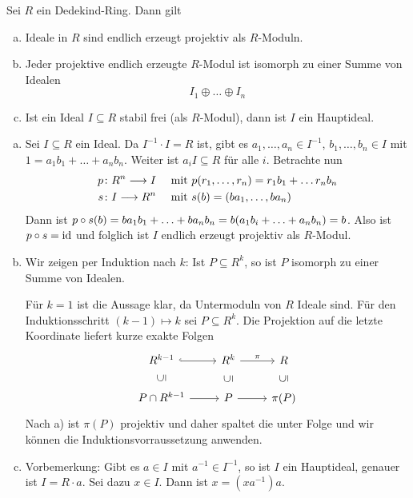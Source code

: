 \begin{lemma}[label=lem:ideale_dedekind]
	Sei $R$ ein Dedekind-Ring.
	Dann gilt
	\begin{enumerate}[a)]
		\item Ideale in $R$ sind endlich erzeugt projektiv als $R$-Moduln.
		\item Jeder projektive endlich erzeugte $R$-Modul ist isomorph zu einer Summe von Idealen 
		\[
			I_1 \oplus \ldots \oplus I_n
		\]
		\item Ist ein Ideal $I \subseteq R$ stabil frei (als $R$-Modul), dann ist $I$ ein Hauptideal.
	\end{enumerate}
\end{lemma}
\begin{beweis}
	\begin{enumerate}[a)]
		\item Sei $I \subseteq R$ ein Ideal. 
		Da $I^{-1} \cdot I=R$ ist, gibt es $a_1, \ldots, a_n \in I^{-1}$, $b_1, \ldots ,b_n \in I$ mit $1= a_1 b_1 + \ldots + a_n b_n$.
		Weiter ist $a_i I \subseteq R$ für alle $i$.
		Betrachte nun 
		\begin{align}
			p \colon R^n \longrightarrow I &\quad \text{ mit } p(r_1,\ldots ,r_n) =r_1 b_1+ \ldots r_n b_n \\
			s \colon I \longrightarrow R^n &\quad \text{ mit } s(b) = \enbrace*{b a_1, \ldots , b a_n}  
		\end{align}
		Dann ist $p \circ s(b) = b a_1 b_1 + \ldots + b a_n b_n = b \enbrace*{a_1 b_i + \ldots + a_n b_n}= b$.
		Also ist $p \circ s =\id$ und folglich ist $I$ endlich erzeugt projektiv als $R$-Modul.
		\item Wir zeigen per Induktion nach $k$: Ist $P \subseteq R^k$, so ist $P$ isomorph zu einer Summe von Idealen.
		
		Für $k=1$ ist die Aussage klar, da Untermoduln von $R$ Ideale sind. Für den Induktionsschritt $(k-1) \mapsto k$ sei $P \subseteq R^k$.
		Die Projektion auf die letzte Koordinate liefert kurze exakte Folgen 
		\[
			\begin{tikzcd}
				R^{k-1} \rar[hook] & R^k \rar["\pi"] & R \\
				P \cap R^{k-1}\uar[phantom,sloped,"\subseteq"] \rar & P \rar \uar[phantom,sloped,"\subseteq"] &  \pi(P) \uar[phantom,sloped,"\subseteq"]
			\end{tikzcd}
		\]
		Nach a) ist $\pi(P)$ projektiv und daher spaltet die unter Folge und wir können die Induktionsvorraussetzung anwenden.
		\item Vorbemerkung: Gibt es $a \in I$ mit $a^{-1} \in I^{-1}$, so ist $I$ ein Hauptideal, genauer ist $I = R \cdot a$.
		Sei dazu $x \in I$.
		Dann ist $x = (x a^{-1}) a$.
		

\end{enumerate}
\end{beweis}
